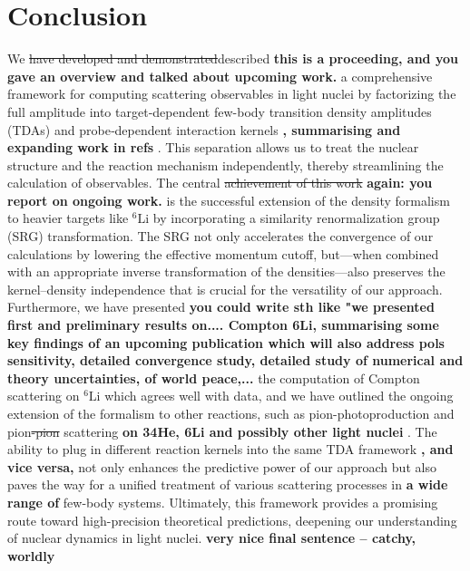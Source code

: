 \documentclass[a4paper,11pt]{article}
\newcommand{\LiS}{{}^{6} \mathrm{Li} }
\newcommand{\com}[1]{\color{blue}\small\textbf{ #1 }\color{black}\normalsize}
\newcommand{\replace}[2]{\sout{\protect#1}\color{blue}#2\color{black}}
\begin{document}
\section{Conclusion}
We \replace{have developed and demonstrated}{described} \com{this is a proceeding, and you gave an overview and talked about upcoming work.} a comprehensive framework for
computing scattering observables in light nuclei by factorizing the
full amplitude into target‐dependent few-body transition density
amplitudes (TDAs) and probe‐dependent interaction kernels\com{, summarising and expanding work in refs\cite{}}.
This separation allows us to treat the nuclear structure and the
reaction mechanism independently, thereby streamlining the
calculation of observables.
The central \sout{achievement of this work}\com{again: you report on ongoing work.} is the successful extension of
the density formalism to heavier targets like $\LiS$ by incorporating a
similarity renormalization group (SRG) transformation.
The SRG not only accelerates the convergence of our calculations by
lowering the effective momentum cutoff, but—when combined with an
appropriate inverse transformation of the densities—also preserves
the kernel–density independence that is crucial for the versatility
of our approach.
Furthermore, we have presented \com{you could write sth like "we presented first and preliminary results on.... Compton 6Li, summarising some key findings of an upcoming publication \cite{} which will also address pols sensitivity, detailed convergence study, detailed study of numerical and theory uncertainties, of world peace,...} the computation of Compton scattering on $\LiS$ which agrees
well with data, and we have outlined the ongoing extension of the formalism to other
reactions, such as pion-photoproduction and pion\sout{-pion} scattering \com{on 34He, 6Li and possibly other light nuclei} \cite{cite your thesis proposal and upcoming publication!}. The
ability to plug in different reaction kernels into the same TDA
framework\com{, and vice versa,} not only enhances the predictive power of our approach but
also paves the way for a unified treatment of various scattering
processes in \com{a wide range of} few-body systems.
Ultimately, this framework provides a promising route toward
high-precision theoretical predictions, deepening our understanding
of nuclear dynamics in light nuclei. \com{very nice final sentence -- catchy, worldly}
\end{document}
